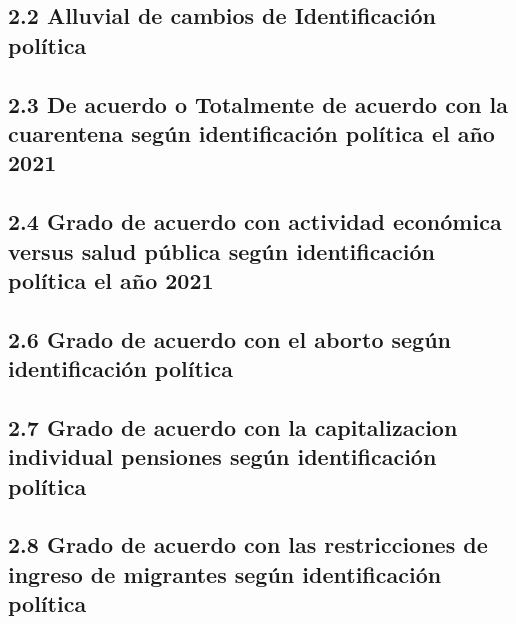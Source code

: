\documentclass[
  12pt,
  openany]{book}
\begin{document}
\hypertarget{alluvial-de-cambios-de-identificaciuxf3n-poluxedtica}{%
\subsection{2.2 Alluvial de cambios de Identificación política}\label{alluvial-de-cambios-de-identificaciuxf3n-poluxedtica}}

\hypertarget{de-acuerdo-o-totalmente-de-acuerdo-con-la-cuarentena-seguxfan-identificaciuxf3n-poluxedtica-el-auxf1o-2021}{%
\subsection{2.3 De acuerdo o Totalmente de acuerdo con la cuarentena según identificación política el año 2021}\label{de-acuerdo-o-totalmente-de-acuerdo-con-la-cuarentena-seguxfan-identificaciuxf3n-poluxedtica-el-auxf1o-2021}}

\hypertarget{grado-de-acuerdo-con-actividad-econuxf3mica-versus-salud-puxfablica-seguxfan-identificaciuxf3n-poluxedtica-el-auxf1o-2021}{%
\subsection{2.4 Grado de acuerdo con actividad económica versus salud pública según identificación política el año 2021}\label{grado-de-acuerdo-con-actividad-econuxf3mica-versus-salud-puxfablica-seguxfan-identificaciuxf3n-poluxedtica-el-auxf1o-2021}}

\hypertarget{grado-de-acuerdo-con-el-aborto-seguxfan-identificaciuxf3n-poluxedtica}{%
\subsection{2.6 Grado de acuerdo con el aborto según identificación política}\label{grado-de-acuerdo-con-el-aborto-seguxfan-identificaciuxf3n-poluxedtica}}

\hypertarget{grado-de-acuerdo-con-la-capitalizacion-individual-pensiones-seguxfan-identificaciuxf3n-poluxedtica}{%
\subsection{2.7 Grado de acuerdo con la capitalizacion individual pensiones según identificación política}\label{grado-de-acuerdo-con-la-capitalizacion-individual-pensiones-seguxfan-identificaciuxf3n-poluxedtica}}

\hypertarget{grado-de-acuerdo-con-las-restricciones-de-ingreso-de-migrantes-seguxfan-identificaciuxf3n-poluxedtica}{%
\subsection{2.8 Grado de acuerdo con las restricciones de ingreso de migrantes según identificación política}\label{grado-de-acuerdo-con-las-restricciones-de-ingreso-de-migrantes-seguxfan-identificaciuxf3n-poluxedtica}}
\end{document}

